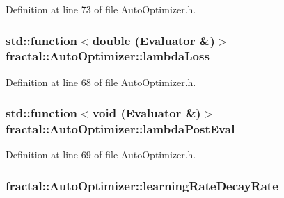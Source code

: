 Definition at line 73 of file Auto\+Optimizer.\+h.

\hypertarget{classfractal_1_1AutoOptimizer_a6e9db9d03a39a7f9c3754562d54c8e6b}{
\subsubsection[{lambda\+Loss}]{\setlength{\rightskip}{0pt plus 5cm}std\+::function$<$double ({\bf Evaluator} \&)$>$ fractal\+::\+Auto\+Optimizer\+::lambda\+Loss\hspace{0.3cm}{\ttfamily [protected]}}}\label{classfractal_1_1AutoOptimizer_a6e9db9d03a39a7f9c3754562d54c8e6b}


Definition at line 68 of file Auto\+Optimizer.\+h.

\hypertarget{classfractal_1_1AutoOptimizer_a0b32551c87870d815b3333315fc72a31}{
\subsubsection[{lambda\+Post\+Eval}]{\setlength{\rightskip}{0pt plus 5cm}std\+::function$<$void ({\bf Evaluator} \&)$>$ fractal\+::\+Auto\+Optimizer\+::lambda\+Post\+Eval\hspace{0.3cm}{\ttfamily [protected]}}}\label{classfractal_1_1AutoOptimizer_a0b32551c87870d815b3333315fc72a31}


Definition at line 69 of file Auto\+Optimizer.\+h.

\hypertarget{classfractal_1_1AutoOptimizer_a063181ceec0a4c7f4e98ba15b74ae6a8}{
\subsubsection[{learning\+Rate\+Decay\+Rate}]{ fractal\+::\+Auto\+Optimizer\+::learning\+Rate\+Decay\+Rate\hspace{0.3cm}{\ttfamily [protected]}}}\label{classfractal_1_1AutoOptimizer_a063181ceec0a4c7f4e98ba15b74ae6a8}


